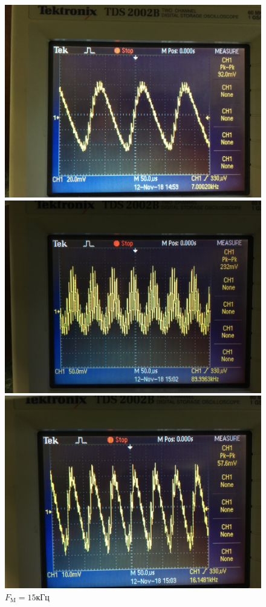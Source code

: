 \begin{figure}[H]
\begin{minipage}{0.32\linewidth}
		\centering
		\includegraphics[width=0.9\linewidth]{photo/7kHztau2.jpg}
		\caption*{$R_2C_2$}
		\caption*{$F_\text{M}=5\text{кГц}$}
	\end{minipage}
	\begin{minipage}{0.32\linewidth}
		\centering
		\includegraphics[width=0.9\linewidth]{photo/15kHztau1.jpg}
		\caption*{$R_1C_1$}
		
	
		\centering
		\includegraphics[width=0.9\linewidth]{photo/15kHztau2.jpg}
		\caption*{$R_2C_2$}
		\caption*{$F_\text{M}=15\text{кГц}$}
	\end{minipage}
\end{figure}


